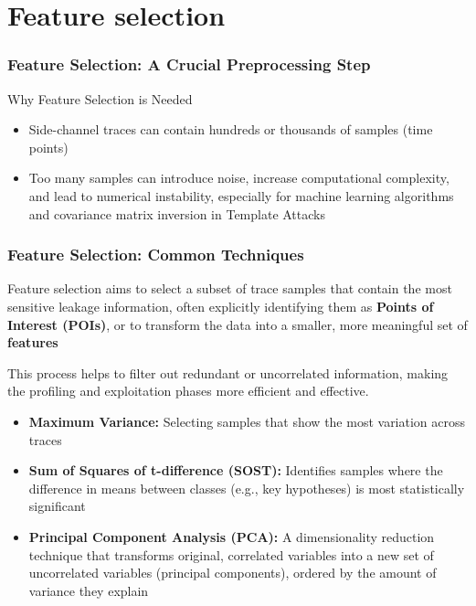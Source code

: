 \section{Feature selection}
 
\begin{frame}
    \frametitle{Feature Selection: A Crucial Preprocessing Step}
    \begin{block}{Why Feature Selection is Needed}
        \begin{itemize}
            \item Side-channel traces can contain hundreds or thousands of samples (time points)
            \item Too many samples can introduce noise, increase computational complexity, and lead to numerical instability, especially for machine learning algorithms and covariance matrix inversion in Template Attacks
        \end{itemize}
    \end{block}
\end{frame}
\begin{frame}
\frametitle{Feature Selection: Common Techniques}
            \item Feature selection aims to select a subset of trace samples that contain the most sensitive leakage information, often explicitly identifying them as \textbf{Points of Interest (POIs)}, or to transform the data into a smaller, more meaningful set of \textbf{features}
            \item This process helps to filter out redundant or uncorrelated information, making the profiling and exploitation phases more efficient and effective.
    \begin{block}{}
        \begin{itemize}
            \begin{itemize}
                \item \textbf{Maximum Variance:} Selecting samples that show the most variation across traces
                \item \textbf{Sum of Squares of t-difference (SOST):} Identifies samples where the difference in means between classes (e.g., key hypotheses) is most statistically significant
                \item \textbf{Principal Component Analysis (PCA):} A dimensionality reduction technique that transforms original, correlated variables into a new set of uncorrelated variables (principal components), ordered by the amount of variance they explain
            \end{itemize}
        \end{itemize}
    \end{block}
\end{frame}


